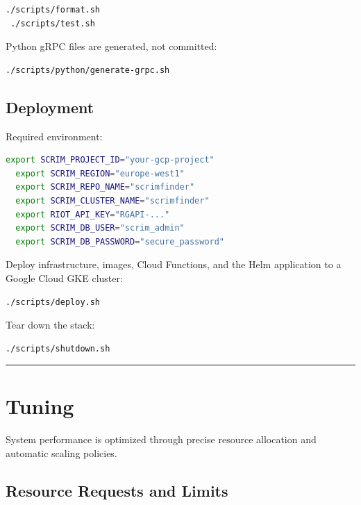 \documentclass[11pt,a4paper]{article}
\begin{document}
 \begin{lstlisting}[language=bash]
 ./scripts/format.sh
 ./scripts/test.sh
 \end{lstlisting}
 
 Python gRPC files are generated, not committed:

 \begin{lstlisting}[language=bash]
 ./scripts/python/generate-grpc.sh
 \end{lstlisting}
 
 \subsection{Deployment}
 
 Required environment:

 \begin{lstlisting}[language=bash]
  export SCRIM_PROJECT_ID="your-gcp-project"
  export SCRIM_REGION="europe-west1"
  export SCRIM_REPO_NAME="scrimfinder"
  export SCRIM_CLUSTER_NAME="scrimfinder"
  export RIOT_API_KEY="RGAPI-..."
  export SCRIM_DB_USER="scrim_admin"
  export SCRIM_DB_PASSWORD="secure_password"
 \end{lstlisting}
 
 Deploy infrastructure, images, Cloud Functions, and the Helm application to a Google Cloud GKE cluster:

 \begin{lstlisting}[language=bash]
  ./scripts/deploy.sh
 \end{lstlisting}
 
 Tear down the stack:

 \begin{lstlisting}[language=bash]
  ./scripts/shutdown.sh
 \end{lstlisting}

 \vspace{1cm}
 \hrule
 \vspace{1cm}

 \section{Tuning}

 System performance is optimized through precise resource allocation and automatic scaling policies.

 \subsection{Resource Requests and Limits}
 
\end{document}
